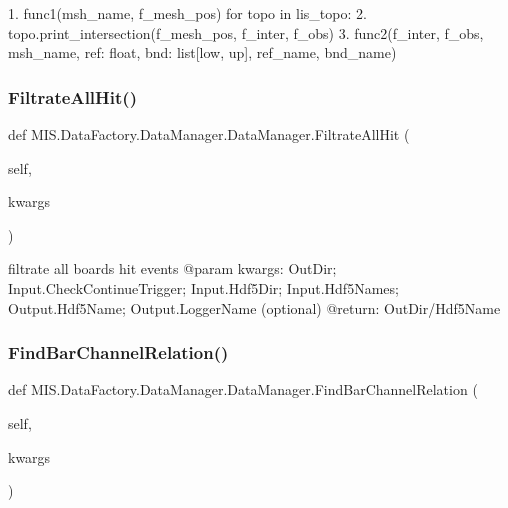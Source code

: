 \begin{DoxyVerb}1.  func1(msh_name, f_mesh_pos)
for topo in lis_topo:
2. topo.print_intersection(f_mesh_pos, f_inter, f_obs)
3. func2(f_inter, f_obs, msh_name, ref: float, bnd: list[low, up], ref_name, bnd_name)\end{DoxyVerb}
 \mbox{\label{classMIS_1_1DataFactory_1_1DataManager_1_1DataManager_a8828518f01b49070ed6b453d7eca6f6e}} 
\subsubsection{\texorpdfstring{Filtrate\+All\+Hit()}{FiltrateAllHit()}}
{\footnotesize\ttfamily def M\+I\+S.\+Data\+Factory.\+Data\+Manager.\+Data\+Manager.\+Filtrate\+All\+Hit (\begin{DoxyParamCaption}\item[{}]{self,  }\item[{}]{kwargs }\end{DoxyParamCaption})}

\begin{DoxyVerb}filtrate all boards hit events
@param kwargs: OutDir; Input.CheckContinueTrigger; Input.Hdf5Dir; Input.Hdf5Names;
    Output.Hdf5Name; Output.LoggerName (optional)
@return: OutDir/Hdf5Name
\end{DoxyVerb}
 \mbox{\label{classMIS_1_1DataFactory_1_1DataManager_1_1DataManager_a59675972a2779a9d74f4cb51983e58f5}} 
\subsubsection{\texorpdfstring{Find\+Bar\+Channel\+Relation()}{FindBarChannelRelation()}}
{\footnotesize\ttfamily def M\+I\+S.\+Data\+Factory.\+Data\+Manager.\+Data\+Manager.\+Find\+Bar\+Channel\+Relation (\begin{DoxyParamCaption}\item[{}]{self,  }\item[{}]{kwargs }\end{DoxyParamCaption})}

